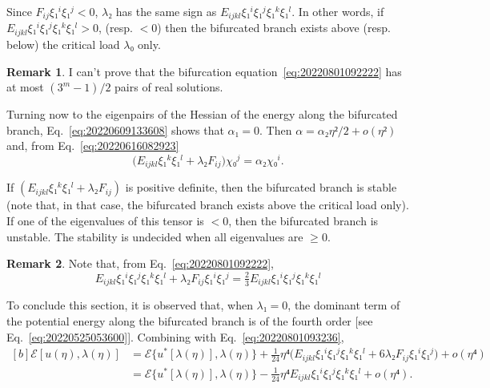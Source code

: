 \documentclass[12pt, final]{scrartcl}
\theoremstyle{definition}
\newtheorem{remark}{Remark}
\begin{document}
Since \(F_{ij} ξ₁^i ξ₁^j < 0\), \(λ₂\) has the same sign as
\(E_{ijkl}ξ₁^i ξ₁^j ξ₁^k ξ₁^l\). In other words, if
\(E_{ijkl}ξ₁^i ξ₁^j ξ₁^k ξ₁^l > 0\), (resp. \(<0\)) then the bifurcated branch
exists above (resp. below) the critical load \(λ₀\) only.

\begin{remark}
  I can't prove that the bifurcation equation~\eqref{eq:20220801092222} has at
  most \((3^m - 1) / 2\) pairs of real solutions.
\end{remark}

Turning now to the eigenpairs of the Hessian of the energy along
the bifurcated branch, Eq.~\eqref{eq:20220609133608} shows that \(α₁ = 0\). Then
\(α = α₂ η² / 2 + o(η²)\) and, from Eq.~\eqref{eq:20220616082923}
\begin{equation}
  \bigl(E_{ijkl} ξ₁^k ξ₁^l + λ₂ F_{ij} \bigr) χ₀^j = α₂ χ₀^i.
\end{equation}

If \((E_{ijkl} ξ₁^k ξ₁^l + λ₂ F_{ij} )\) is positive definite, then the
bifurcated branch is stable (note that, in that case, the bifurcated branch
exists above the critical load only). If one of the eigenvalues of this tensor
is \(<0\), then the bifurcated branch is unstable. The stability is undecided
when all eigenvalues are \(≥ 0\).

\begin{remark}
  Note that, from Eq.~\eqref{eq:20220801092222},
  \begin{equation}
    E_{ijkl} ξ₁^i ξ₁^j ξ₁^k ξ₁^l + λ₂ F_{ij} ξ₁^i ξ₁^j = \tfrac{2}{3} E_{ijkl} ξ₁^i ξ₁^j ξ₁^k ξ₁^l
  \end{equation}

\end{remark}

To conclude this section, it is observed that, when \(λ₁ = 0\), the dominant
term of the potential energy along the bifurcated branch is of the fourth order
[see Eq.~\eqref{eq:20220525053600}]. Combining with Eq.~\eqref{eq:20220801093236},
\begin{equation}
  \label{eq:20220801094437}
  \begin{aligned}[b]
    ℰ[u(η), λ(η)]
    &= ℰ\{u^{\ast}[λ(η)], λ(η)\} + \tfrac{1}{24} η⁴ \bigl(E_{ijkl} ξ₁^i ξ₁^j ξ₁^k ξ₁^l  + 6  λ₂ F_{ij} ξ₁^i ξ₁^j\bigr) + o(η⁴)\\
    &= ℰ\{u^{\ast}[λ(η)], λ(η)\} - \tfrac{1}{24} η⁴ E_{ijkl} ξ₁^i ξ₁^j ξ₁^k ξ₁^l + o(η⁴).
  \end{aligned}
\end{equation}
\end{document}

